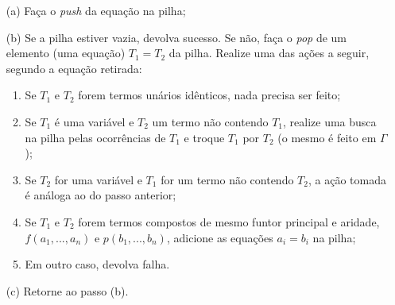 \documentclass{article}
\theoremstyle{remark}
\theoremstyle{theorem}
\begin{document}
\begin{itemize}
    \item[(a)] Faça o \textit{push} da equação na pilha;
    \item[(b)] Se a pilha estiver vazia, devolva sucesso. Se não, faça o \textit{pop} de um elemento (uma equação) $T_1 = T_2$ da pilha. Realize uma das ações a seguir, segundo a equação retirada:
      \begin{enumerate}
        \item Se $T_1$ e $T_2$ forem termos unários idênticos, nada precisa ser feito;
        \item Se $T_1$ é uma variável e $T_2$ um termo não contendo $T_1$, realize uma busca na pilha pelas ocorrências de $T_1$ e troque $T_1$ por $T_2$ (o mesmo é feito em $\Gamma$); %
        \item Se $T_2$ for uma variável e $T_1$ for um termo não contendo $T_2$, a ação tomada é análoga ao do passo anterior; %
        \item Se $T_1$ e $T_2$ forem termos compostos de mesmo funtor principal e aridade, $f(a_1, ..., a_n)$ e $p(b_1, ..., b_n)$, adicione as equações $a_i = b_i$ na pilha;
        \item Em outro caso, devolva falha.
      \end{enumerate}
    \item[(c)] Retorne ao passo (b).
\end{itemize}






\end{document}
